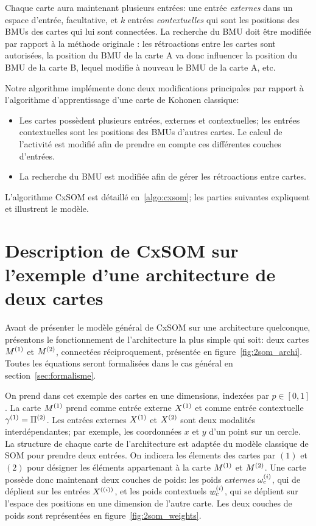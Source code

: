 Chaque carte aura maintenant plusieurs entrées: une entrée \emph{externes} dans un espace d'entrée, facultative, et $k$ entrées \emph{contextuelles} qui sont les positions des BMUs des cartes qui lui sont connectées. 
La recherche du BMU doit être modifiée par rapport à la méthode originale : les rétroactions entre les cartes sont autorisées, la position du BMU de la carte A va donc influencer la position du BMU de la carte B, lequel modifie à nouveau le BMU de la carte A, etc. 


Notre algorithme implémente donc deux modifications principales par rapport à l'algorithme d'apprentissage d'une carte de Kohonen classique: 
\begin{itemize}
\item Les cartes possèdent plusieurs entrées, externes et contextuelles; les entrées contextuelles sont les positions des BMUs d'autres cartes. Le calcul de l'activité est modifié afin de prendre en compte ces différentes couches d'entrées.
\item La recherche du BMU est modifiée afin de gérer les rétroactions entre cartes.
\end{itemize}

L'algorithme CxSOM est détaillé en~\ref{algo:cxsom}; les parties suivantes expliquent et illustrent le modèle.

\section{Description de CxSOM sur l'exemple d'une architecture de deux cartes}
Avant de présenter le modèle général de CxSOM sur une architecture quelconque, présentons le fonctionnement de l'architecture la plus simple qui soit: deux cartes $M^{({1})}$ et $M^{({2})}$, connectées réciproquement, présentée en figure~\ref{fig:2som_archi}. Toutes les équations seront formalisées dans le cas général en section~\ref{sec:formalisme}.


On prend dans cet exemple des cartes en une dimensions, indexées par $p \in [0,1]$.
La carte $M^{({1})}$ prend comme entrée externe $X^{({1})}$ et comme entrée contextuelle $\gamma^{({1})} = \Pi^{({2})}$. Les entrées externes $X^{({1})}$ et $X^{({2})}$ sont deux modalités interdépendantes; par exemple, les coordonnées $x$ et $y$ d'un point sur un cercle. 
La structure de chaque carte de l'architecture est adaptée du modèle classique de SOM pour prendre deux entrées. On indicera les élements des cartes par $(1)$ et $(2)$ pour désigner les éléments appartenant à la carte $M^{({1})}$ et $M^{({2})}$.
Une carte possède donc maintenant deux couches de poids: les poids \emph{externes} $\omega_e^{({i})}$, qui de déplient sur les entrées $X^{({(i)})}$, et les poids contextuels $w_c^{({i})}$, qui se déplient sur l'espace des positions en une dimension de l'autre carte. Les deux couches de poids sont représentées en figure~\ref{fig:2som_weights}.

